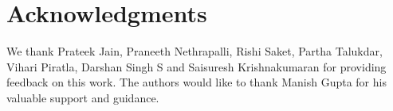 \section{Acknowledgments}
We thank Prateek Jain, Praneeth Nethrapalli, Rishi Saket, Partha Talukdar, Vihari Piratla, Darshan Singh S and Saisuresh Krishnakumaran for providing feedback on this work. The authors would like to thank Manish Gupta for his valuable support and guidance.